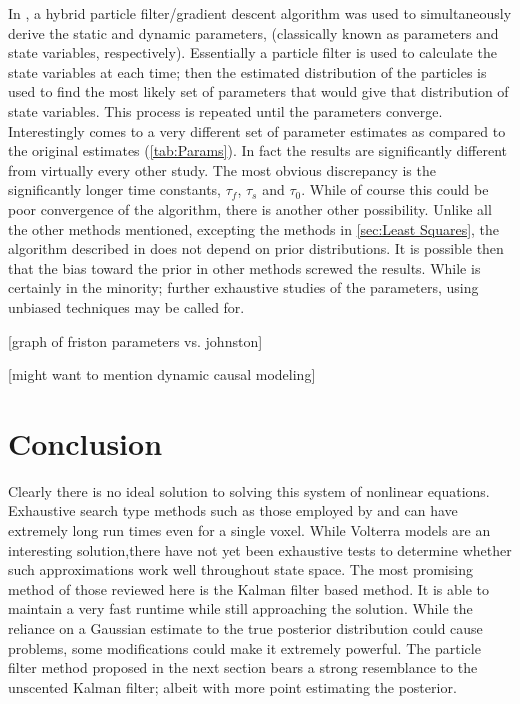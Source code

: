 In \cite{Johnston2008}, a hybrid particle filter/gradient
descent algorithm was used to simultaneously derive the static and dynamic 
parameters, (classically known as parameters and state variables, respectively).
Essentially a particle filter is used to calculate the state variables at each
time; then the estimated distribution of the particles is used to find
the most likely set of parameters that would give that distribution of state variables.
This process is repeated until the parameters converge. Interestingly
\cite{Johnston2008} comes to a very different set of parameter estimates as compared
to the original \cite{Friston2000} estimates (\autoref{tab:Params}). In fact the results 
are significantly different from virtually every other study. The most obvious discrepancy
is the significantly longer time constants, $\tau_f$, $\tau_s$ and $\tau_0$. 
While of course this could be poor convergence of the algorithm, there is another other possibility.
Unlike all the other methods mentioned, excepting the methods in \autoref{sec:Least Squares},
the algorithm described in \cite{Johnston2008} does not depend on prior distributions.
It is possible then that the bias toward the prior in other methods screwed the results. 
While \cite{Johnston2008} is certainly in the minority; further exhaustive studies 
of the parameters, using unbiased techniques may be called for. 

[graph of friston parameters vs. johnston]

[might want to mention dynamic causal modeling]

\section{Conclusion}
Clearly there is no ideal solution to solving this system of nonlinear
equations. Exhaustive search type methods such as those employed by
\cite{Johnston2008} and \cite{Vakorin2007} can have extremely long
run times even for a single voxel. While Volterra models are an interesting
solution,there have not yet been exhaustive tests to determine whether
such approximations work well throughout state space. The most promising
method of those reviewed here is the Kalman filter based method. It is
able to maintain a very fast runtime while still approaching the solution.
While the reliance on a Gaussian estimate to the true posterior distribution could
cause problems, some modifications could make it extremely powerful. 
The particle filter method proposed in the next section bears a strong 
resemblance to the unscented Kalman filter; albeit with more point estimating
the posterior. 

